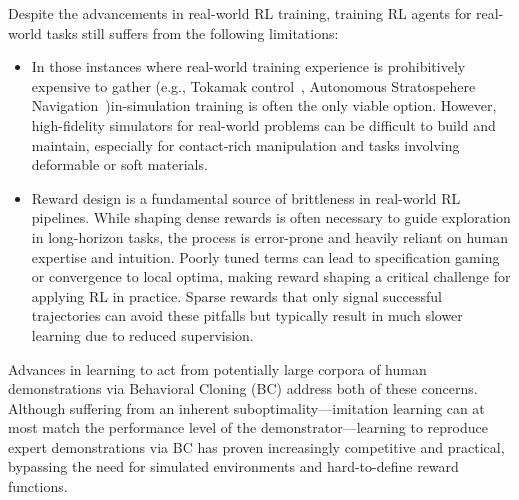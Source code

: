 Despite the advancements in real-world RL training, training RL agents for real-world tasks still suffers from the following limitations:
\begin{itemize}
\item In those instances where real-world training experience is prohibitively expensive to gather (e.g., Tokamak control~\citep{degraveMagneticControlTokamak2022}, Autonomous Stratospehere Navigation~\citep{bellemareAutonomousNavigationStratospheric2020})in-simulation training is often the only viable option. 
However, high-fidelity simulators for real-world problems can be difficult to build and maintain, especially for contact-rich manipulation and tasks involving deformable or soft materials.

\item Reward design is a fundamental source of brittleness in real-world RL pipelines. While shaping dense rewards is often necessary to guide exploration in long-horizon tasks, the process is error-prone and heavily reliant on human expertise and intuition. Poorly tuned terms can lead to specification gaming or convergence to local optima, making reward shaping a critical challenge for applying RL in practice. Sparse rewards that only signal successful trajectories can avoid these pitfalls but typically result in much slower learning due to reduced supervision.
\end{itemize}

Advances in learning to act from potentially large corpora of human demonstrations via Behavioral Cloning (BC) address both of these concerns.
Although suffering from an inherent suboptimality---imitation learning can at most match the performance level of the demonstrator---learning to reproduce expert demonstrations via BC has proven increasingly competitive and practical, bypassing the need for simulated environments and hard-to-define reward functions.

